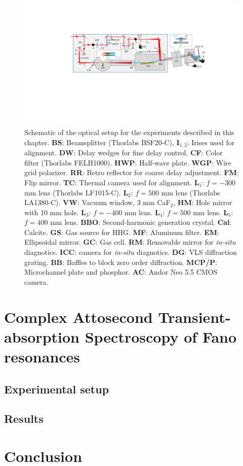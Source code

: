 \begin{figure}
	\centering
	\includegraphics[width=1.0\textwidth]{figures/CATS/beamline_schematic_CATS.pdf}
	\caption[TABLe experimental setup for ATS experiments]{Schematic of the optical setup for the experiments described in this chapter.  \textbf{BS}: Beamsplitter (Thorlabs BSF20-C), \textbf{I$_{1,2}$}: Irises used for alignment. \textbf{DW}: Delay wedges for fine delay control. \textbf{CF}: Color filter (Thorlabs FELH1000). \textbf{HWP}: Half-wave plate. \textbf{WGP}: Wire grid polarizer. \textbf{RR}: Retro reflector for coarse delay adjustment.  \textbf{FM}: Flip mirror. \textbf{TC}: Thermal camera used for alignment.  \textbf{L$_1$}: $f=-300$ mm lens (Thorlabs LF1015-C). \textbf{L$_2$}: $f=500$ mm lens (Thorlabs LA1380-C). \textbf{VW}: Vacuum window, 3 mm CaF$_2$, \textbf{HM}: Hole mirror with 10 mm hole.  \textbf{L$_3$}: $f=-400$ mm lens.  \textbf{L$_4$}: $f=500$ mm lens. \textbf{L$_5$}: $f=400$ mm lens.  \textbf{BBO}: Second-harmonic generation crystal.  \textbf{Cal}: Calcite. \textbf{GS}: Gas source for HHG. \textbf{MF}: Aluminum filter. \textbf{EM}: Ellipsoidal mirror. \textbf{GC}: Gas cell. \textbf{RM}: Removable mirror for \textit{in-situ} diagnotics.    \textbf{ICC}: camera for \textit{in-situ} diagnotics. \textbf{DG}: VLS diffraction grating. \textbf{BB}: Baffles to block zero order diffraction.  \textbf{MCP/P}: Microchannel plate and phosphor.  \textbf{AC}: Andor Neo 5.5 CMOS camera.}
	\label{fig:CATS_setup}
\end{figure}

\section{Complex Attosecond Transient-absorption Spectroscopy of Fano resonances}
\label{sec:CATS_ar}

\subsection{Experimental setup}
\label{sec:CATS_ar_exp_setup}

\subsection{Results}
\label{sec:CATS_ar_results}


\section{Conclusion}
\label{sec:CATS_conclusion}